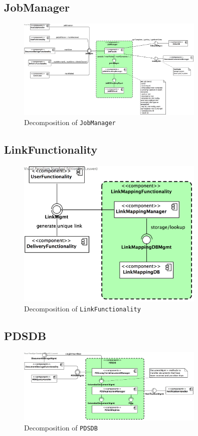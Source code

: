\documentclass[a4paper,10pt]{article}
\begin{document}
\subsection{JobManager}
\begin{figure}[!htp]
	\centering
	\includegraphics[width=0.8\textwidth]{JobManager.png}
	\caption{Decomposition of \texttt{JobManager}}
	\label{fig:decomp-JobManager}
\end{figure}

\subsection{LinkFunctionality}
\begin{figure}[!htp]
	\centering
	\includegraphics[width=0.8\textwidth]{LinkFunctionality.png}
	\caption{Decomposition of \texttt{LinkFunctionality}}
	\label{fig:decomp-LinkFunctionality}
\end{figure}

\subsection{PDSDB}
\begin{figure}[!htp]
	\centering
	\includegraphics[width=0.8\textwidth]{PDSDB.png}
	\caption{Decomposition of \texttt{PDSDB}}
	\label{fig:decomp-PDSDB}
\end{figure}
\end{document}

